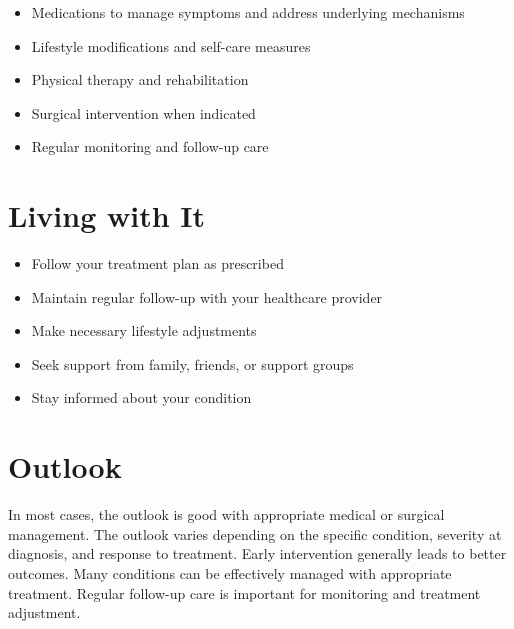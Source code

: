 \begin{itemize}[noitemsep]
  \item Medications to manage symptoms and address underlying mechanisms
  \item Lifestyle modifications and self-care measures
  \item Physical therapy and rehabilitation
  \item Surgical intervention when indicated
  \item Regular monitoring and follow-up care
\end{itemize}
\section{Living with It}
\begin{itemize}[noitemsep]
  \item Follow your treatment plan as prescribed
  \item Maintain regular follow-up with your healthcare provider
  \item Make necessary lifestyle adjustments
  \item Seek support from family, friends, or support groups
  \item Stay informed about your condition
\end{itemize}
\section{Outlook}
In most cases, the outlook is good with appropriate medical or surgical management. The outlook varies depending on the specific condition, severity at diagnosis, and response to treatment. Early intervention generally leads to better outcomes. Many conditions can be effectively managed with appropriate treatment. Regular follow-up care is important for monitoring and treatment adjustment.
